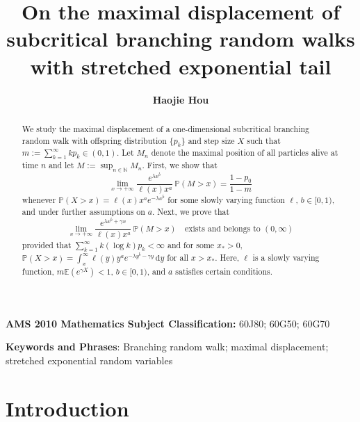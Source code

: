 \documentclass[11pt]{article}
\numberwithin{equation}{section}
\begin{document}
	\allowdisplaybreaks
	
	
	\title{\Large \bf On the maximal displacement of subcritical branching random walks with  stretched exponential tail}
	\author{ \bf   Haojie Hou
	}
	\date{}
	\maketitle
	
	\begin{abstract}
		We study the maximal displacement of a one-dimensional subcritical branching random walk with offspring distribution $\{p_k\}$ and step size $X$ such that $m := \sum_{k=1}^\infty k p_k \in (0,1)$. Let $M_n$ denote the maximal position of all particles alive at time $n$ and let $M := \sup_{n \in \mathbb{N}} M_n$. First, we show that
		\[
		\lim_{x \to +\infty} \frac{e^{\lambda x^b}}{\ell(x) x^a } \, \mathbb{P}(M > x) = \frac{1 - p_0}{1 - m}
		\]
		whenever $\mathbb{P}(X > x) = \ell(x) x^a e^{-\lambda x^b}$ for some slowly varying function $\ell$, $b \in [0,1)$, and under further assumptions on $a$. Next, we prove that
		\[
		\lim_{x \to +\infty} \frac{e^{\lambda x^b+\gamma x}}{\ell(x) x^a } \, \mathbb{P}(M > x) \quad \text{exists and belongs to } (0, \infty)
		\]
		provided that $\sum_{k=1}^\infty k (\log k) p_k < \infty$ and for some $x_*>0$, $\mathbb{P}(X > x) = \int_x^\infty \ell(y) y^a e^{-\lambda y^b - \gamma y} \, \mathrm{d}y$ for all $x > x_*$. Here, $\ell$ is a slowly varying function, $m \mathbb{E}(e^{\gamma X}) < 1$, $b \in [0,1)$, and $a$ satisfies certain conditions.
	\end{abstract}
	
	\medskip
	
	\noindent\textbf{AMS 2010 Mathematics Subject Classification:} 60J80; 60G50; 60G70
	
	\medskip
	

	
	\noindent\textbf{Keywords and Phrases}: Branching random walk; maximal displacement; stretched exponential random variables
	
\section{Introduction}
\end{document}
